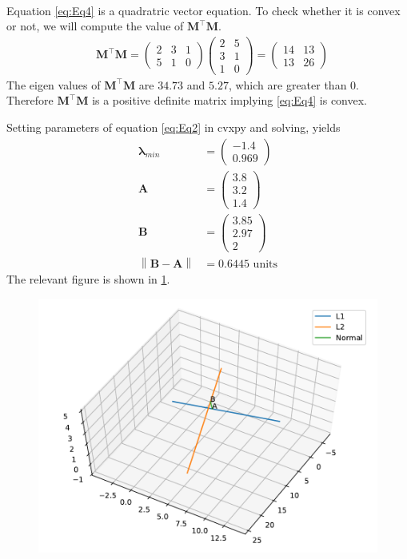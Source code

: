 \documentclass[12pt]{article}
\providecommand{\norm}[1]{\left\lVert#1\right\rVert}
\newcommand{\myvec}[1]{\ensuremath{\begin{pmatrix}#1\end{pmatrix}}}
\let\vec\mathbf
\begin{document}
\begin{enumerate}
\begin{align}
\end{align}
Equation \eqref{eq:Eq4} is a quadratric vector equation. To check whether it is convex or not, we will compute the value of $\vec{M}^\top\vec{M}$.
\begin{align}
	&\vec{M}^\top\vec{M} =  \myvec{2&3&1\\5&1&0}\myvec{2&5\\3&1\\1&0} = \myvec{14&13\\13&26}
\end{align}
The eigen values of $\vec{M}^\top\vec{M}$ are $34.73$ and $5.27$, which are greater than 0. Therefore $\vec{M}^\top\vec{M}$ is a positive definite matrix implying \eqref{eq:Eq4} is convex. 

Setting parameters of equation \eqref{eq:Eq2} in cvxpy and solving, yields
\begin{align}
	\bm{\lambda}_{min} &= \myvec{-1.4\\ 0.969} \\
	\vec{A} &= \myvec{3.8\\3.2\\ 1.4}\\
	\vec{B} &= \myvec{3.85\\2.97\\ 2}\\
	\norm{\vec{B}-\vec{A}} &= 0.6445 \text{ units}
\end{align}
The relevant figure is shown in \ref{fig:Fig1}. 
\begin{figure}[!h]
	\begin{center}
		\includegraphics[width=\columnwidth]{figs/problem30.pdf}
	\end{center}
\caption{}
\label{fig:Fig1}
\end{figure}
\end{enumerate}
\end{document}
